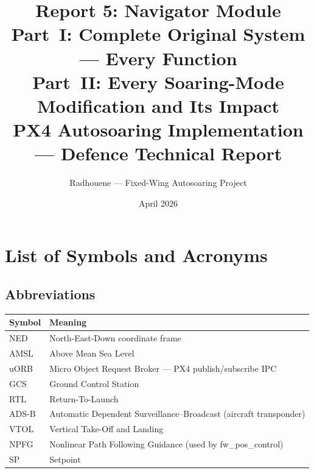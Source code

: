 \documentclass[12pt,a4paper]{article}
\title{\textbf{Report 5: Navigator Module}\\[0.4em]
\large \textbf{Part~I:} Complete Original System --- Every Function\\
\textbf{Part~II:} Every Soaring-Mode Modification and Its Impact\\[0.5em]
\normalsize PX4 Autosoaring Implementation --- Defence Technical Report}
\author{Radhouene --- Fixed-Wing Autosoaring Project}
\date{April 2026}
\begin{document}
\maketitle
\tableofcontents
\newpage

\section*{List of Symbols and Acronyms}

\subsection*{Abbreviations}
\begin{center}\begin{tabular}{ll}\toprule
Symbol & Meaning \\\midrule
NED & North-East-Down coordinate frame \\
AMSL & Above Mean Sea Level \\
uORB & Micro Object Request Broker --- PX4 publish/subscribe IPC \\
GCS & Ground Control Station \\
RTL & Return-To-Launch \\
ADS-B & Automatic Dependent Surveillance--Broadcast (aircraft transponder) \\
VTOL & Vertical Take-Off and Landing \\
NPFG & Nonlinear Path Following Guidance (used by fw\_pos\_control) \\
SP & Setpoint \\
\bottomrule\end{tabular}\end{center}
\end{document}

